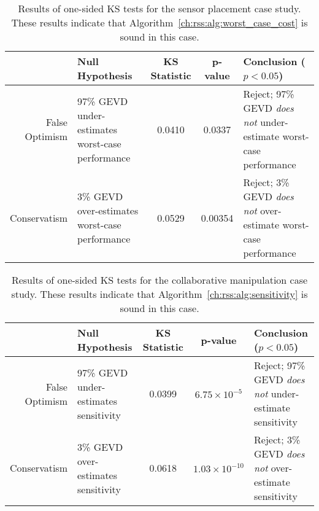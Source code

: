 \begin{table*}[thb]
    \renewcommand{\arraystretch}{1.5}
    \centering
    \begin{tabular}{r||p{4cm}|c|c|p{5cm}}
                     & Null Hypothesis                                & \shortstack{KS                                                                                     \\ Statistic} & p-value & Conclusion ($p < 0.05$)                                                   \\ \hline\hline
        \shortstack{False                                                                                                                                                  \\Optimism} & 97\% GEVD under-estimates worst-case performance & 0.0410         & 0.0337  & Reject; 97\% GEVD \textit{does not} under-estimate worst-case performance \\ \hline
        Conservatism & 3\% GEVD over-estimates worst-case performance & 0.0529         & 0.00354 & Reject; 3\% GEVD \textit{does not} over-estimate worst-case performance
    \end{tabular}
    \caption{Results of one-sided KS tests for the sensor placement case study. These results indicate that Algorithm~\ref{ch:rss:alg:worst_case_cost} is sound in this case.}\label{ch:rss:tab:ks_test_agv}
\end{table*}

\begin{table*}[thb]
    \renewcommand{\arraystretch}{1.5}
    \centering
    \begin{tabular}{r||p{4cm}|c|c|p{5cm}}
                     & Null Hypothesis                     & \shortstack{KS                                                                                       \\ Statistic} & p-value              & Conclusion ($p < 0.05$)                                        \\ \hline\hline
        \shortstack{False                                                                                                                                         \\Optimism} & 97\% GEVD under-estimates sensitivity & 0.0399         & $6.75\times10^{-5}$  & Reject; 97\% GEVD \textit{does not} under-estimate sensitivity \\ \hline
        Conservatism & 3\% GEVD over-estimates sensitivity & 0.0618         & $1.03\times10^{-10}$ & Reject; 3\% GEVD \textit{does not} over-estimate sensitivity
    \end{tabular}
    \caption{Results of one-sided KS tests for the collaborative manipulation case study. These results indicate that Algorithm~\ref{ch:rss:alg:sensitivity} is sound in this case.}\label{ch:rss:tab:ks_test_mam}
\end{table*}

